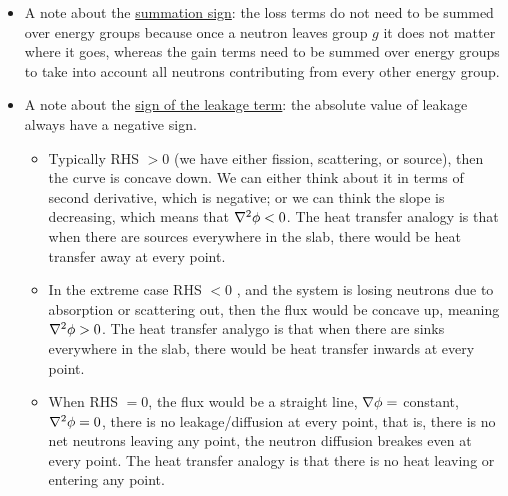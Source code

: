 \documentclass{school-22.211-notes}
\begin{document}
\begin{itemize}
\item A note about the \uline{summation sign}: the loss terms do not need to be summed over energy groups because once a neutron leaves group $g$ it does not matter where it goes, whereas the gain terms need to be summed over energy groups to take into account all neutrons contributing from every other energy group. 

\item A note about the \uline{sign of the leakage term}: the absolute value of leakage always have a negative sign. 
  \begin{itemize}
  \item Typically RHS $>0$ (we have either fission, scattering, or source), then the curve is concave down. We can either think about it in terms of second derivative, which is negative; or we can think the slope is decreasing, which means that $\nabla^2 \phi < 0$. The heat transfer analogy is that when there are sources everywhere in the slab, there would be heat transfer away at every point. 
    
  \item In the extreme case RHS $<0$ , and the system is losing neutrons due to absorption or scattering out, then the flux would be concave up, meaning $\nabla^2 \phi > 0$. The heat transfer analygo is that when there are sinks everywhere in the slab, there would be heat transfer inwards at every point. 

  \item When RHS $=0$, the flux would be a straight line, $\nabla \phi = $ constant, $\nabla^2 \phi = 0$, there is no leakage/diffusion at every point, that is, there is no net neutrons leaving any point, the neutron diffusion breakes even at every point. The heat transfer analogy is that there is no heat leaving or entering any point. 
  \end{itemize}
\end{itemize}
\end{document}
